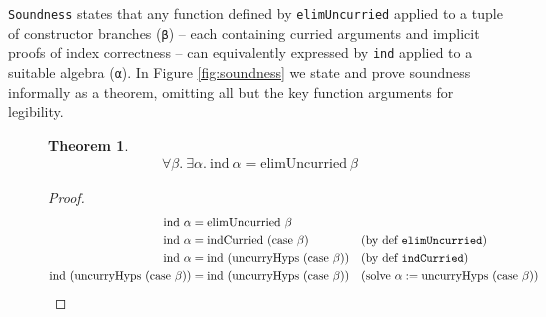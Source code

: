 \documentclass[nonatbib]{sigplanconf}
\newtheorem*{mythm}{Theorem}
\newcommand{\reffig}[1]{Figure \ref{fig:#1}}
\begin{document}
{\tt Soundness} states that any function defined by
{\tt elimUncurried} applied to a tuple of constructor branches
({\tt β}) --
each containing curried arguments and implicit proofs of index
correctness -- can equivalently expressed by {\tt ind} applied to a
suitable algebra ({\tt α}). 
In \reffig{soundness} we state and prove soundness informally
as a theorem, omitting all but the key function arguments for legibility.

\begin{figure*}
\caption{Soundness of {\tt elim}}
\label{fig:soundness}
\begin{mythm}
\begin{align*}
\forall \beta. ~ \exists \alpha.
~ \textrm{ind} ~ \alpha = \textrm{elimUncurried} ~ \beta
\end{align*}
\end{mythm}

\begin{proof}
\begin{align*}
\textrm{ind} ~ \alpha &= \textrm{elimUncurried} ~ \beta& && \\
\textrm{ind} ~ \alpha &=\textrm{indCurried} ~ ( \textrm{case} ~ \beta ) && \text{(by def {\tt elimUncurried})} \\
\textrm{ind} ~ \alpha &= \textrm{ind} ~ ( \textrm{uncurryHyps} ~ ( \textrm{case} ~ \beta ) ) && \text{(by def {\tt indCurried})} \\
\textrm{ind} ~ ( \textrm{uncurryHyps} ~ ( \textrm{case} ~ \beta ) ) &= \textrm{ind} ~ ( \textrm{uncurryHyps} ~ ( \textrm{case} ~ \beta ) ) && (\text{solve} ~ \alpha := \textrm{uncurryHyps} ~ ( \textrm{case} ~ \beta ))
\end{align*}
\end{proof}
\end{figure*}
\end{document}
